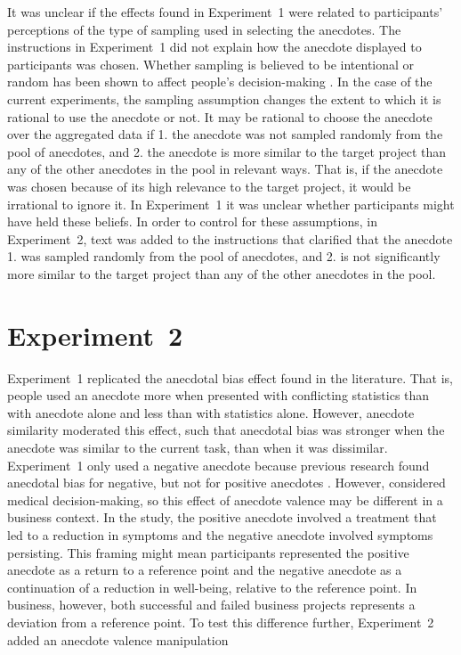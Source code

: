 \documentclass[a4paper, nobind, dvipsnames]{templates/ociamthesis}
\theoremstyle{definition}
\theoremstyle{definition}
\theoremstyle{definition}
\theoremstyle{definition}
\theoremstyle{remark}
\begin{document}
It was unclear if the effects found in Experiment~1 were related to
participants' perceptions of the type of sampling used in selecting the
anecdotes. The instructions in Experiment~1 did not explain how the anecdote
displayed to participants was chosen. Whether sampling is believed to be
intentional or random has been shown to affect people's decision-making \autocite[e.g.,][]{hayes2019}. In the case of the current experiments, the sampling assumption
changes the extent to which it is rational to use the anecdote or not. It may be
rational to choose the anecdote over the aggregated data if 1. the anecdote was
not sampled randomly from the pool of anecdotes, and 2. the anecdote is more
similar to the target project than any of the other anecdotes in the pool in
relevant ways. That is, if the anecdote was chosen because of its high relevance
to the target project, it would be irrational to ignore it. In Experiment~1 it
was unclear whether participants might have held these beliefs. In order to
control for these assumptions, in Experiment~2, text was added to the
instructions that clarified that the anecdote 1. was sampled randomly from the
pool of anecdotes, and 2. is not significantly more similar to the target
project than any of the other anecdotes in the pool.

\hypertarget{anecdotes-2}{%
\section{Experiment~2}\label{anecdotes-2}}

Experiment~1 replicated the anecdotal bias effect found in the literature. That
is, people used an anecdote more when presented with conflicting statistics than
with anecdote alone and less than with statistics alone. However, anecdote
similarity moderated this effect, such that anecdotal bias was stronger when the
anecdote was similar to the current task, than when it was dissimilar.
Experiment~1 only used a negative anecdote because previous research found
anecdotal bias for negative, but not for positive anecdotes \autocite{jaramillo2019}.
However, \textcite{jaramillo2019} considered medical decision-making, so this effect of
anecdote valence may be different in a business context. In the study, the
positive anecdote involved a treatment that led to a reduction in symptoms and
the negative anecdote involved symptoms persisting. This framing might mean
participants represented the positive anecdote as a return to a reference point
and the negative anecdote as a continuation of a reduction in well-being,
relative to the reference point. In business, however, both successful and
failed business projects represents a deviation from a reference point. To test
this difference further, Experiment~2 added an anecdote valence manipulation
\end{document}
